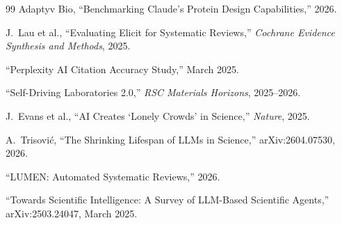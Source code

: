 \documentclass[11pt,a4paper]{article}
\begin{document}
\begin{thebibliography}{99}
Adaptyv Bio, ``Benchmarking Claude's Protein Design Capabilities,'' 2026.

J.~Lau et al., ``Evaluating Elicit for Systematic Reviews,'' \emph{Cochrane Evidence Synthesis and Methods}, 2025.

``Perplexity AI Citation Accuracy Study,'' March 2025.

``Self-Driving Laboratories 2.0,'' \emph{RSC Materials Horizons}, 2025--2026.

J.~Evans et al., ``AI Creates `Lonely Crowds' in Science,'' \emph{Nature}, 2025.

A.~Trisovi\'{c}, ``The Shrinking Lifespan of LLMs in Science,'' arXiv:2604.07530, 2026.

``LUMEN: Automated Systematic Reviews,'' 2026.

``Towards Scientific Intelligence: A Survey of LLM-Based Scientific Agents,'' arXiv:2503.24047, March 2025.

\end{thebibliography}
\end{document}
